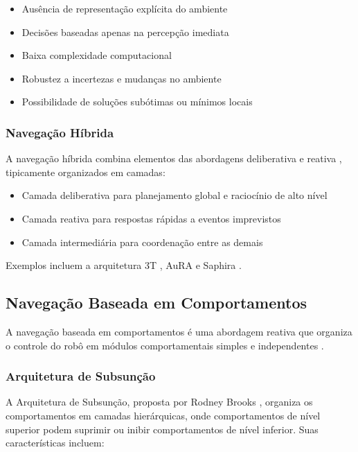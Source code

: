 \begin{itemize}
    \item Ausência de representação explícita do ambiente
    \item Decisões baseadas apenas na percepção imediata
    \item Baixa complexidade computacional
    \item Robustez a incertezas e mudanças no ambiente
    \item Possibilidade de soluções subótimas ou mínimos locais
\end{itemize}

\subsubsection{Navegação Híbrida}

A navegação híbrida combina elementos das abordagens deliberativa e reativa \cite{Murphy2000, Arkin1998}, tipicamente organizados em camadas:

\begin{itemize}
    \item Camada deliberativa para planejamento global e raciocínio de alto nível
    \item Camada reativa para respostas rápidas a eventos imprevistos
    \item Camada intermediária para coordenação entre as demais
\end{itemize}

Exemplos incluem a arquitetura 3T \cite{Bonasso1997}, AuRA \cite{Arkin1987} e Saphira \cite{Konolige1997}.

\subsection{Navegação Baseada em Comportamentos}

A navegação baseada em comportamentos é uma abordagem reativa que organiza o controle do robô em módulos comportamentais simples e independentes \cite{Arkin1998, Brooks1986}.

\subsubsection{Arquitetura de Subsunção}

A Arquitetura de Subsunção, proposta por Rodney Brooks \cite{Brooks1986}, organiza os comportamentos em camadas hierárquicas, onde comportamentos de nível superior podem suprimir ou inibir comportamentos de nível inferior. Suas características incluem:

